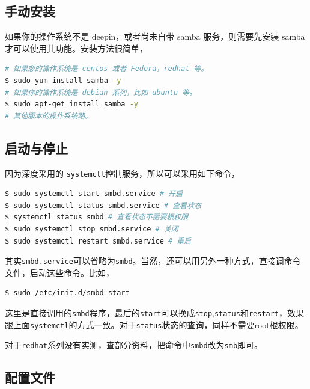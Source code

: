 \documentclass[doctor,openright,twoside]{sjtuthesis}
\newcommand{\passthrough}[1]{#1}
\theoremstyle{plain}
\theoremstyle{definition}
\theoremstyle{remark}
\theoremstyle{ocrenumbox}
\theoremstyle{plain}
\begin{document}
\subsection{手动安装}

如果你的操作系统不是 deepin，或者尚未自带 samba 服务，则需要先安装 samba
才可以使用其功能。安装方法很简单，

\begin{lstlisting}[language=bash]
# 如果您的操作系统是 centos 或者 Fedora，redhat 等。
$ sudo yum install samba -y
# 如果你的操作系统是 debian 系列，比如 ubuntu 等。
$ sudo apt-get install samba -y
# 其他版本的操作系统略。
\end{lstlisting}

\subsection{启动与停止}

因为深度采用的
\passthrough{\lstinline!systemctl!}控制服务，所以可以采用如下命令，

\begin{lstlisting}[language=bash]
$ sudo systemctl start smbd.service # 开启
$ sudo systemctl status smbd.service # 查看状态
$ systemctl status smbd # 查看状态不需要根权限
$ sudo systemctl stop smbd.service # 关闭
$ sudo systemctl restart smbd.service # 重启
\end{lstlisting}

其实\passthrough{\lstinline!smbd.service!}可以省略为\passthrough{\lstinline!smbd!}。当然，还可以用另外一种方式，直接调命令文件，启动这些命令。比如，

\begin{lstlisting}[language=bash]
$ sudo /etc/init.d/smbd start
\end{lstlisting}

这里是直接调用的\passthrough{\lstinline!smbd!}程序，最后的\passthrough{\lstinline!start!}可以换成\passthrough{\lstinline!stop!},\passthrough{\lstinline!status!}和\passthrough{\lstinline!restart!}，效果跟上面\passthrough{\lstinline!systemctl!}的方式一致。对于\passthrough{\lstinline!status!}状态的查询，同样不需要root根权限。

对于\passthrough{\lstinline!redhat!}系列没有实测，查部分资料，把命令中\passthrough{\lstinline!smbd!}改为\passthrough{\lstinline!smb!}即可。

\subsection{配置文件}
\end{document}
